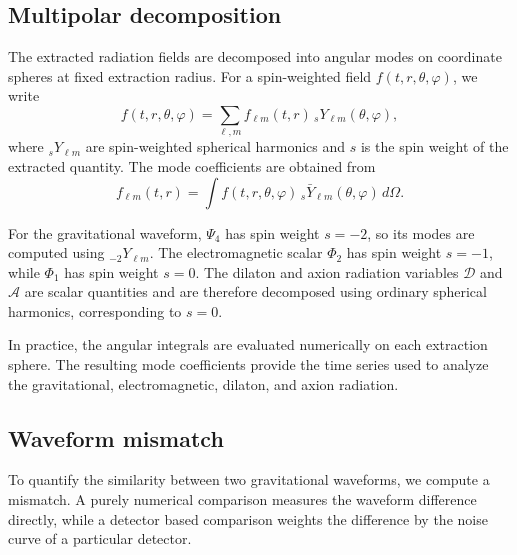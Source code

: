 \subsection{Multipolar decomposition}

The extracted radiation fields are decomposed into angular modes on coordinate spheres at fixed extraction radius. For a spin-weighted field $f(t,r,\theta,\varphi)$, we write
\begin{equation}
    f(t,r,\theta,\varphi)
    =
    \sum_{\ell,m}
    f_{\ell m}(t,r)\,
    {}_{s}Y_{\ell m}(\theta,\varphi),
    \label{eq:app waveex mode expansion}
\end{equation}
where ${}_{s}Y_{\ell m}$ are spin-weighted spherical harmonics and $s$ is the spin weight of the extracted quantity. The mode coefficients are obtained from
\begin{equation}
    f_{\ell m}(t,r)
    =
    \int
    f(t,r,\theta,\varphi)\,
    {}_{s}\bar{Y}_{\ell m}(\theta,\varphi)\,
    d\Omega .
    \label{eq:app waveex mode coefficient}
\end{equation}

For the gravitational waveform, $\Psi_4$ has spin weight $s=-2$, so its modes are computed using ${}_{-2}Y_{\ell m}$. The electromagnetic scalar $\Phi_2$ has spin weight $s=-1$, while $\Phi_1$ has spin weight $s=0$. The dilaton and axion radiation variables $\mathcal{D}$ and $\mathcal{A}$ are scalar quantities and are therefore decomposed using ordinary spherical harmonics, corresponding to $s=0$.

In practice, the angular integrals are evaluated numerically on each extraction sphere. The resulting mode coefficients provide the time series used to analyze the gravitational, electromagnetic, dilaton, and axion radiation.

\subsection{Waveform mismatch}

To quantify the similarity between two gravitational waveforms, we compute a mismatch. A purely numerical comparison measures the waveform difference directly, while a detector based comparison weights the difference by the noise curve of a particular detector.

